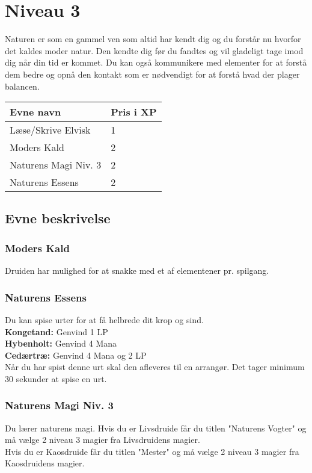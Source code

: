 \chapter{Niveau 3}

Naturen er som en gammel ven som altid har kendt dig og du forstår nu hvorfor det kaldes moder natur. Den kendte dig før du fandtes og vil gladeligt tage imod dig når din tid er kommet.
Du kan også kommunikere med elementer for at forstå dem bedre og opnå den kontakt som er nødvendigt for at forstå hvad der plager balancen.


\begin{table}[H]
    \centering
    \begin{tabular}{|p{}|p{}|}
    \rowcolor{cerulean!80}\hline
        Evne navn & Pris i XP \\\hline
    Læse/Skrive Elvisk & 1\\\hline
    Moders Kald & 2\\\hline
    Naturens Magi Niv. 3 & 2\\\hline
    Naturens Essens & 2 \\\hline
    \end{tabular}
\end{table}
\section{Evne beskrivelse}



\subsection{Moders Kald}
Druiden har mulighed for at snakke med et af elementener pr. spilgang.

\subsection{Naturens Essens}
Du kan spise urter for at få helbrede dit krop og sind.\\
\textbf{Kongetand:} Genvind 1 LP\\
\textbf{Hybenholt:} Genvind 4 Mana\\
\textbf{Cedærtræ:} Genvind 4 Mana og 2 LP\\
Når du har spist denne urt skal den afleveres til en arrangør. Det tager minimum 30 sekunder at spise en urt.

\subsection{Naturens Magi Niv. 3}
Du lærer naturens magi. Hvis du er Livsdruide får du titlen "Naturens Vogter" og må vælge 2 niveau 3 magier fra Livsdruidens magier.\\ Hvis du er Kaosdruide får du titlen "Mester" og må vælge 2 niveau 3 magier fra Kaosdruidens magier.\\
